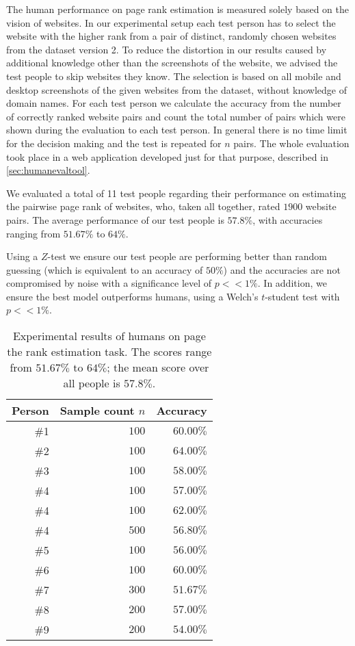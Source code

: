 The human performance on page rank estimation is measured solely based on the vision of websites. In our experimental setup each test person has to select the website with the higher rank from a pair of distinct, randomly chosen websites from the dataset version 2. To reduce the distortion in our results caused by additional knowledge other than the screenshots of the website, we advised the test people to skip websites they know. The selection is based on all mobile and desktop screenshots of the given websites from the dataset, without knowledge of domain names.
For each test person we calculate the accuracy from the number of correctly ranked website pairs and count the total number of pairs which were shown during the evaluation to each test person. In general there is no time limit for the decision making and the test is repeated for $n$ pairs.
The whole evaluation took place in a web application developed just for that purpose, described in \ref{sec:humanevaltool}.

We evaluated a total of 11 test people regarding their performance on estimating the pairwise page rank of websites, who, taken all together, rated $1900$ website pairs. The average performance of our test people is $57.8\%$, with accuracies ranging from $51.67\%$ to $64\%$.

Using a $Z$-test we ensure our test people are performing better than random guessing (which is equivalent to an accuracy of $50\%$) and the accuracies are not compromised by noise with a significance level of $p << 1\%$. In addition, we ensure the best model outperforms humans, using a Welch's $t$-student test with $p << 1\%$.

\begin{table}
	\center
	\begin{tabular}{rrr}
		\textbf{Person} & \textbf{Sample count $n$} & \textbf{Accuracy} \\ \hline
		\#1 & $100$ & $60.00\%$\\
		\#2 & $100$ & $64.00\%$\\
		\#3 & $100$ & $58.00\%$\\
        \#4 & $100$ & $57.00\%$\\
        \#4 & $100$ & $62.00\%$\\
        \#4 & $500$ & $56.80\%$\\
		\#5 & $100$ & $56.00\%$\\
		\#6 & $100$ & $60.00\%$\\
		\#7 & $300$ & $51.67\%$\\
		\#8 & $200$ & $57.00\%$\\
		\#9 & $200$ & $54.00\%$\\
	\end{tabular}
	\caption[Experimental results of humans on the page rank estimation task]{Experimental results of humans on page the rank estimation task. The scores range from $51.67\%$ to $64\%$; the mean score over all people is $57.8\%$.}
\label{table_human_eval_results}
\end{table}

